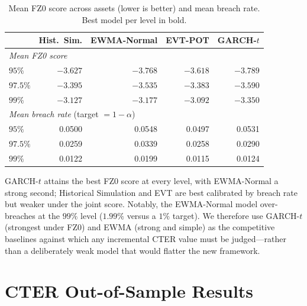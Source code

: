 \documentclass[11pt]{article}
\begin{document}
\begin{table}[t]
\centering
\caption{Mean FZ0 score across assets (lower is better) and mean breach rate. Best model per level in bold.}
\label{tab:fz}
\begin{tabular}{lrrrr}
\toprule
& Hist.\ Sim. & EWMA-Normal & EVT-POT & GARCH-$t$ \\
\midrule
\multicolumn{5}{l}{\emph{Mean FZ0 score}}\\
\quad $95\%$   & $-3.627$ & $-3.768$ & $-3.618$ & $\mathbf{-3.789}$ \\
\quad $97.5\%$ & $-3.395$ & $-3.535$ & $-3.383$ & $\mathbf{-3.590}$ \\
\quad $99\%$   & $-3.127$ & $-3.177$ & $-3.092$ & $\mathbf{-3.350}$ \\
\midrule
\multicolumn{5}{l}{\emph{Mean breach rate} (target $=1-\alpha$)}\\
\quad $95\%$   & 0.0500 & 0.0548 & 0.0497 & 0.0531 \\
\quad $97.5\%$ & 0.0259 & 0.0339 & 0.0258 & 0.0290 \\
\quad $99\%$   & 0.0122 & 0.0199 & 0.0115 & 0.0124 \\
\bottomrule
\end{tabular}
\end{table}

GARCH-$t$ attains the best FZ0 score at every level, with EWMA-Normal a strong second; Historical Simulation
and EVT are best calibrated by breach rate but weaker under the joint score. Notably, the EWMA-Normal model
over-breaches at the $99\%$ level ($1.99\%$ versus a $1\%$ target). We therefore use GARCH-$t$ (strongest
under FZ0) and EWMA (strong and simple) as the competitive baselines against which any incremental CTER
value must be judged---rather than a deliberately weak model that would flatter the new framework.

\section{CTER Out-of-Sample Results}\label{sec:cterresults}
\end{document}
